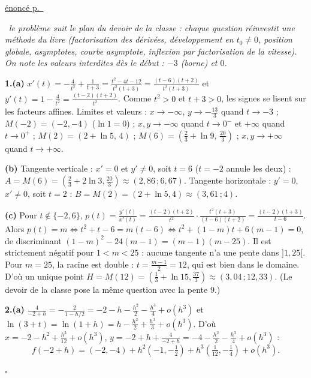 \documentclass[a4paper,11pt]{article}
\numberwithin{equation}{section}
\numberwithin{figure}{section}
\numberwithin{table}{section}
\theoremstyle{enonce}
\theoremstyle{exemple}
\theoremstyle{remarque}
\newenvironment{corrige}[1]{%
  \par\needspace{6\baselineskip}\vspace{1em}\phantomsection\label{c:#1}%
  \noindent{\sffamily\bfseries\color{Bleu}Exercice~\ref{e:#1}}\quad
  {\scriptsize\sffamily\hyperref[e:#1]{\color{Gris}énoncé p.~\pageref{e:#1}}}\par\nobreak\vspace{0.2em}}%
  {\hfill\textcolor{BleuClair}{$\square$}\par}
\newcommand{\demarche}[1]{\noindent{\sffamily\bfseries\small\color{BleuMoyen}Démarche.}\ \textit{#1}\par\smallskip}
\begin{document}
\begin{corrige}{ds-pb}
\demarche{le problème suit le plan du devoir de la classe : chaque question réinvestit une méthode du livre (factorisation des dérivées, développement en $t_0\neq0$, position globale, asymptotes, courbe asymptote, inflexion par factorisation de la vitesse). On note les valeurs interdites dès le début : $-3$ (borne) et $0$.}

\textbf{1.(a)} $x'(t)=-\frac4{t^2}+\frac1{t+3}=\frac{t^2-4t-12}{t^2(t+3)}=\frac{(t-6)(t+2)}{t^2(t+3)}$ et
$y'(t)=1-\frac4{t^2}=\frac{(t-2)(t+2)}{t^2}$. Comme $t^2>0$ et $t+3>0$, les signes se lisent sur les facteurs affines. Limites et
valeurs : $x\to-\infty$, $y\to-\frac{13}3$ quand $t\to-3$ ; $M(-2)=(-2,-4)$ ($\ln1=0$) ; $x,y\to-\infty$ quand $t\to0^-$ et
$+\infty$ quand $t\to0^+$ ; $M(2)=(2+\ln5,\,4)$ ; $M(6)=\left(\frac23+\ln9,\,\frac{20}3\right)$ ; $x,y\to+\infty$ quand $t\to+\infty$.
\begin{center}
\end{center}

\textbf{(b)} Tangente verticale : $x'=0$ et $y'\neq0$, soit $t=6$ ($t=-2$ annule les deux) :
$A=M(6)=\left(\frac23+2\ln3,\frac{20}3\right)\approx(2{,}86\,;6{,}67)$. Tangente horizontale : $y'=0$, $x'\neq0$, soit $t=2$ :
$B=M(2)=(2+\ln5,4)\approx(3{,}61\,;4)$.

\textbf{(c)} Pour $t\notin\{-2,6\}$, $p(t)=\frac{y'(t)}{x'(t)}=\frac{(t-2)(t+2)}{t^2}\cdot\frac{t^2(t+3)}{(t-6)(t+2)}=\frac{(t-2)(t+3)}{t-6}$.
Alors $p(t)=m\iff t^2+t-6=m(t-6)\iff t^2+(1-m)t+6(m-1)=0$, de discriminant
$(1-m)^2-24(m-1)=(m-1)(m-25)$. Il est strictement négatif pour $1<m<25$ : aucune tangente n'a une pente dans $]1,25[$. Pour
$m=25$, la racine est double : $t=\frac{m-1}2=12$, qui est bien dans le domaine. D'où un unique point
$H=M(12)=\left(\frac13+\ln15,\frac{37}3\right)\approx(3{,}04\,;12{,}33)$. (Le devoir de la classe pose la même question avec la
pente $9$.)

\textbf{2.(a)} $\frac4{-2+h}=-\frac2{1-h/2}=-2-h-\frac{h^2}2-\frac{h^3}4+o(h^3)$ et $\ln(3+t)=\ln(1+h)=h-\frac{h^2}2+\frac{h^3}3+o(h^3)$.
D'où $x=-2-h^2+\frac{h^3}{12}+o(h^3)$, $y=-2+h+\frac4{-2+h}=-4-\frac{h^2}2-\frac{h^3}4+o(h^3)$ :
\[f(-2+h)=(-2,-4)+h^2\left(-1,-\tfrac12\right)+h^3\left(\tfrac1{12},-\tfrac14\right)+o(h^3).\]


\end{corrige}
\end{document}
